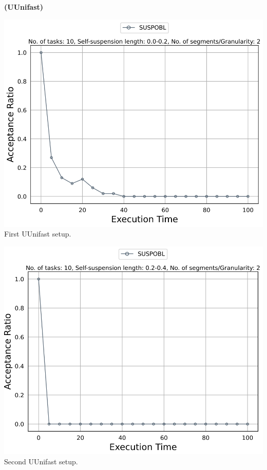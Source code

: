 \documentclass[]{article}
\begin{document}
	\begin{minipage}[t]{0.48\linewidth}
		\centering
		\textbf{(UUnifast)}
		\vspace{0.3cm}
		
		\includegraphics[width=\linewidth]{Capture.png}
		First UUnifast setup.

  
		\vspace{0.3cm}
		
		\includegraphics[width=\linewidth]{Capture2_uunifast.png}
		Second UUnifast setup.
		\vspace{0.3cm}
		

\end{minipage}
\end{document}
